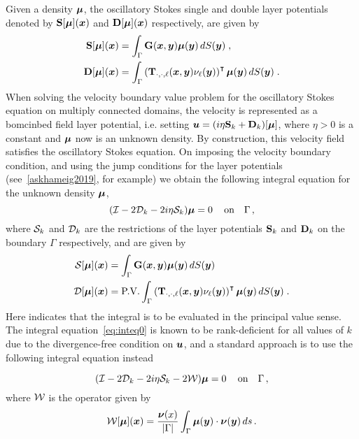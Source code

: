 Given a density ${\boldsymbol \mu}$, the oscillatory Stokes single and double layer
potentials denoted by ${\bf S}[{\boldsymbol \mu}]({\boldsymbol x})$ and ${\bf D}[{\boldsymbol \mu}]({\boldsymbol x})$ respectively,
are given by
\begin{align} \label{eq:singlelayer}
  {\bf S} [{\boldsymbol \mu}] ({\boldsymbol x}) &= \int_\Gamma {\bf G} ({\boldsymbol x},{\boldsymbol y}) {\boldsymbol \mu}({\boldsymbol y})
  \, dS({\boldsymbol y}) \; , \\
  {\bf D} [{\boldsymbol \mu}] ({\boldsymbol x}) &= \int_\Gamma \left ( {\bf T}_{\cdot,\cdot,\ell}({\boldsymbol x},{\boldsymbol y})
  \nu_\ell({\boldsymbol y})\right )^\intercal {\boldsymbol \mu}({\boldsymbol y}) \, dS({\boldsymbol y}) \; .
\end{align}
When solving the velocity boundary value problem for the oscillatory
Stokes equation on multiply connected domains, the velocity
is represented as a bomcinbed field layer potential, i.e.
setting ${\boldsymbol u} = (i\eta {\bf S}_{k} + {\bf D}_{k})[{\boldsymbol \mu}]$, where
$\eta>0$ is a constant and ${\boldsymbol \mu}$ now is an unknown density.
By construction, this velocity field satisfies the oscillatory
Stokes equation.
On imposing the velocity boundary condition, and using the jump
conditions for the layer potentials (see~\cref{askhameig2019}, 
for example)
we obtain the following integral equation for the unknown density
${\boldsymbol \mu}$,
\begin{equation}
\label{eq:inteq0}
(\mathcal I - 2{\mathcal D}_{k} -2i \eta {\mathcal S}_{k}){\boldsymbol \mu} = 0 \, \quad \textrm{on} \quad \Gamma \,,
\end{equation}
where ${\mathcal S}_{k}$ and ${\mathcal D}_{k}$ are the restrictions of the layer potentials
${\bf S}_{k}$ and ${\bf D}_{k}$ on the boundary $\Gamma$ respectively, and are given
by
\begin{align}
  {\mathcal S} [{\boldsymbol \mu}] ({\boldsymbol x}) &= \int_\Gamma {\bf G} ({\boldsymbol x},{\boldsymbol y}) {\boldsymbol \mu}({\boldsymbol y})
  \, dS({\boldsymbol y}) \\
  {\mathcal D} [{\boldsymbol \mu}] ({\boldsymbol x}) &= \textrm{P.V.} \int_\Gamma \left ( {\bf T}_{\cdot,\cdot,\ell}({\boldsymbol x},{\boldsymbol y})
  \nu_\ell({\boldsymbol y})
  \right )^\intercal {\boldsymbol \mu}({\boldsymbol y}) \, dS({\boldsymbol y}) \; .
\end{align}
Here \pv indicates that the integral is to be
evaluated in the principal value sense.
The integral equation~\cref{eq:inteq0} is known to be rank-deficient
for all values of $k$ due to the divergence-free condition
on ${\boldsymbol u}$, and a standard approach is to use the following integral 
equation instead

\begin{equation}
\label{eq:inteq}
(\mathcal I - 2{\mathcal D}_{k} -2i \eta {\mathcal S}_{k}-2{\mathcal W}){\boldsymbol \mu} = 0 \, \quad \textrm{on} \quad \Gamma \,,
\end{equation}
where ${\mathcal W}$ is the operator given by
\begin{equation}
{\mathcal W}[{\boldsymbol \mu}]({\boldsymbol x}) = \frac{{\boldsymbol \nu}(x)}{|\Gamma|}\int_{\Gamma} {\boldsymbol \mu}({\boldsymbol y}) \cdot {\boldsymbol \nu}({\boldsymbol y}) \, ds \, .
\end{equation}

